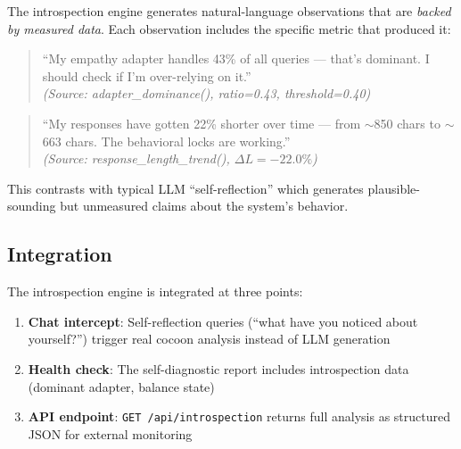 The introspection engine generates natural-language observations that are
\emph{backed by measured data}. Each observation includes the specific
metric that produced it:

\begin{quote}
``My empathy adapter handles 43\% of all queries --- that's dominant. I
should check if I'm over-relying on it.'' \\
\emph{(Source: adapter\_dominance(), ratio=0.43, threshold=0.40)}
\end{quote}

\begin{quote}
``My responses have gotten 22\% shorter over time --- from $\sim$850 chars
to $\sim$663 chars. The behavioral locks are working.'' \\
\emph{(Source: response\_length\_trend(), $\Delta L = -22.0\%$)}
\end{quote}

This contrasts with typical LLM ``self-reflection'' which generates
plausible-sounding but unmeasured claims about the system's behavior.

\subsection{Integration}

The introspection engine is integrated at three points:
\begin{enumerate}
    \item \textbf{Chat intercept}: Self-reflection queries (``what have you
    noticed about yourself?'') trigger real cocoon analysis instead of LLM
    generation
    \item \textbf{Health check}: The self-diagnostic report includes
    introspection data (dominant adapter, balance state)
    \item \textbf{API endpoint}: \texttt{GET /api/introspection} returns full
    analysis as structured JSON for external monitoring
\end{enumerate}



